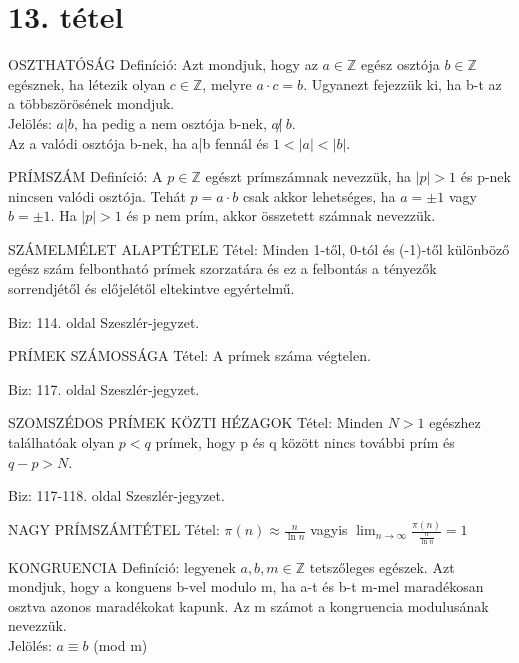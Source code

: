 \section{13. tétel}

\begin{definicio}{
OSZTHATÓSÁG Definíció}: Azt mondjuk, hogy az $a \in \mathbb{Z}$ egész osztója $b \in \mathbb{Z}$ egésznek, ha létezik olyan $c \in \mathbb{Z}$, melyre $a \cdot c = b$. Ugyanezt fejezzük ki, ha b-t az a többszörösének mondjuk. \\
Jelölés: $a|b$, ha pedig a nem osztója b-nek, $a\!\not|\ b$.\\Az a valódi osztója b-nek, ha a|b fennál és $1 < |a| < |b|$.
\end{definicio}
\begin{definicio}{
PRÍMSZÁM Definíció}: A $p \in \mathbb{Z}$ egészt prímszámnak nevezzük, ha $|p| > 1$ és p-nek nincsen valódi osztója. Tehát $p = a \cdot b$ csak akkor lehetséges, ha $a = \pm 1$ vagy $b = \pm 1$. Ha $|p| > 1$ és p nem prím, akkor összetett számnak nevezzük.
\end{definicio}
\begin{tetel}{
SZÁMELMÉLET ALAPTÉTELE Tétel}: Minden 1-től, 0-tól és (-1)-től különböző egész szám felbontható prímek szorzatára és ez a felbontás a tényezők sorrendjétől és előjelétől eltekintve egyértelmű.
\end{tetel}
\begin{leftbar}
Biz: 114. oldal Szeszlér-jegyzet.
\end{leftbar}
\begin{tetel}{
PRÍMEK SZÁMOSSÁGA Tétel}: A prímek száma végtelen.
\end{tetel}
\begin{leftbar}
Biz: 117. oldal Szeszlér-jegyzet.
\end{leftbar}
\begin{tetel}{
SZOMSZÉDOS PRÍMEK KÖZTI HÉZAGOK Tétel}: Minden $N > 1$ egészhez találhatóak olyan $p < q$ prímek, hogy p és q között nincs további prím és $q-p>N$.
\end{tetel}
\begin{leftbar}
Biz: 117-118. oldal Szeszlér-jegyzet.
\end{leftbar}
\begin{tetel}{
NAGY PRÍMSZÁMTÉTEL Tétel}: $\pi(n) \approx \frac{n}{\ln{n}}$ vagyis $\lim_{n\to\infty} \frac{\pi(n)}{\frac{n}{\ln{n}}} = 1$
\end{tetel}
\begin{definicio}{
KONGRUENCIA Definíció}: legyenek $a,b,m\in\mathbb{Z}$ tetszőleges egészek. Azt mondjuk, hogy a konguens b-vel modulo m, ha a-t és b-t m-mel maradékosan osztva azonos maradékokat kapunk. Az m számot a kongruencia modulusának nevezzük. \\
Jelölés: $a \equiv b$ (mod m)

\end{definicio}
